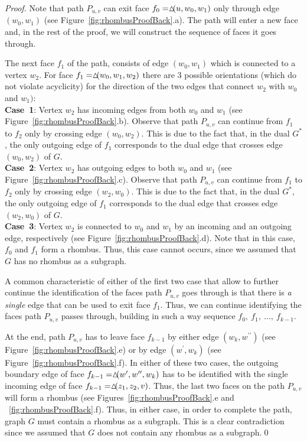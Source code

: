\documentclass{myllncs-mixalis}
\begin{document}
\begin{proof}
Note that path $P_{u,v}$ can exit face
$f_0=\vartriangle\hspace*{-5pt}(u,w_0,w_1)$ only through edge
$(w_0,w_1)$ (see Figure~\ref{fig:rhombusProofBack}.a). The path will
enter a new face and, in the rest of the proof, we will construct
the sequence of faces it goes through.

The next face $f_1$ of the path,  consists of edge $(w_0,w_1)$ which
is connected to a vertex $w_2$. For face
$f_1=\vartriangle\hspace*{-5pt}(w_0,w_1, w_2)$ there are 3 possible
orientations (which do not violate acyclicity) for the direction of
the two edges that connect $w_2$ with $w_0$ and $w_1)$:\\
\textbf{Case~1}: Vertex $w_2 $ has incoming edges from both $w_0$
and $w_1$ (see Figure~\ref{fig:rhombusProofBack}.b). Observe that
path $P_{u,v}$ can continue from $f_1$ to $f_2$ only by crossing
edge $(w_0, w_2)$. This is due to the fact that, in the dual $G^*$,
the only outgoing edge of $f_1$ corresponds to the dual edge that
crosses edge $(w_0, w_2)$ of $G$. \\
\textbf{Case~2}: Vertex $w_2 $ has outgoing edges to both $w_0$ and
$w_1$ (see Figure~\ref{fig:rhombusProofBack}.c). Observe that path
$P_{u,v}$ can continue from $f_1$ to $f_2$ only by crossing edge
$(w_2, w_0)$. This is due to the fact that, in the dual $G^*$, the
only outgoing edge of $f_1$ corresponds to the dual edge that
crosses edge $(w_2, w_0)$ of $G$. \\
\textbf{Case~3}: Vertex $w_2 $ is connected to   $w_0$ and $w_1$ by
an incoming and an outgoing edge, respectively (see
Figure~\ref{fig:rhombusProofBack}.d). Note that in this case, $f_0$
and $f_1$ form a rhombus. Thus, this case cannot occurs, since we
assumed that $G$ has no rhombus as a subgraph.

A common characteristic of either of the first two case that allow
to further continue the identification of the faces path  $P_{u,v}$
goes through is that there is \emph{a single} edge that can be used
to exit face $f_1$. Thus, we can continue identifying the faces path
$P_{u,v}$  passes through, building in such a way sequence $f_0,
~f_1, ~\ldots, ~f_{k-1}$.

At the end, path $P_{u,v}$ has to leave face $f_{k-1}$ by either
edge $(w_k, w^{\prime\prime})$ (see
Figure~\ref{fig:rhombusProofBack}.e) or by edge $(w^{\prime}, w_k)$
(see Figure~\ref{fig:rhombusProofBack}.f). In either of these two
cases, the outgoing boundary edge of face
$f_{k-1}=\vartriangle\hspace*{-5pt}(w^{\prime},w^{\prime\prime},
w_k)$ has to be identified with the single incoming edge of face
$f_{k-1}=\vartriangle\hspace*{-5pt}(z_1,z_2, v)$. Thus, the last two
faces on the path $P_{u,v}$ will form a rhombus (see
Figures~\ref{fig:rhombusProofBack}.e and
~\ref{fig:rhombusProofBack}.f). Thus, in either case, in order to
complete the path, graph $G$ must contain a rhombus as a subgraph.
This is a clear contradiction since we assumed that $G$ does not
contain any rhombus as a subgraph.\qed
\end{proof}
\end{document}

